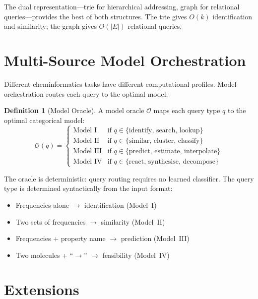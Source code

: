 \documentclass[11pt,twocolumn,a4paper]{article}
\theoremstyle{definition}
\newtheorem{definition}[theorem]{Definition}
\theoremstyle{remark}
\newcommand{\Oracle}{\mathcal{O}}
\begin{document}
The dual representation---trie for hierarchical addressing, graph for relational queries---provides the best of both structures. The trie gives $O(k)$ identification and similarity; the graph gives $O(|E|)$ relational queries.


\section{Multi-Source Model Orchestration}
\label{sec:orchestration}

Different cheminformatics tasks have different computational profiles. Model orchestration routes each query to the optimal model:

\begin{definition}[Model Oracle]
\label{def:oracle}
A model oracle $\Oracle$ maps each query type $q$ to the optimal categorical model:
\begin{equation}
\Oracle(q) = \begin{cases}
\text{Model I} & \text{if } q \in \{\text{identify, search, lookup}\} \\
\text{Model II} & \text{if } q \in \{\text{similar, cluster, classify}\} \\
\text{Model III} & \text{if } q \in \{\text{predict, estimate, interpolate}\} \\
\text{Model IV} & \text{if } q \in \{\text{react, synthesise, decompose}\}
\end{cases}
\label{eq:oracle}
\end{equation}
\end{definition}

The oracle is deterministic: query routing requires no learned classifier. The query type is determined syntactically from the input format:
\begin{itemize}[nosep]
\item Frequencies alone $\to$ identification (Model~I)
\item Two sets of frequencies $\to$ similarity (Model~II)
\item Frequencies + property name $\to$ prediction (Model~III)
\item Two molecules + ``$\to$'' $\to$ feasibility (Model~IV)
\end{itemize}


\section{Extensions}
\label{sec:extensions}
\end{document}
